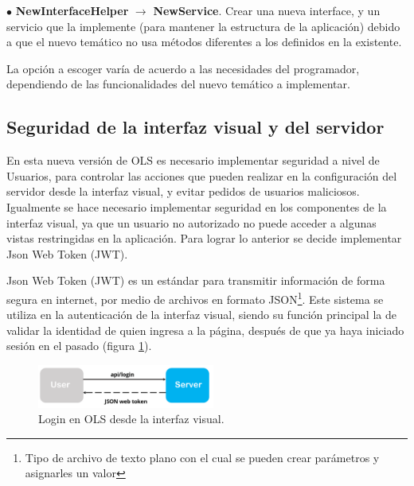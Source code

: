 $\bullet$ \textbf{NewInterfaceHelper} $\rightarrow$ \textbf{NewService}. Crear una nueva interface, y un servicio que la implemente (para mantener la estructura de la aplicaci\'on) debido a que el nuevo tem\'atico no usa m\'etodos diferentes a los definidos en la existente.

La opci\'on a escoger var\'ia de acuerdo a las necesidades del programador, dependiendo de las funcionalidades del nuevo tem\'atico a implementar.



\subsection{Seguridad de la interfaz visual y del servidor}
En esta nueva versi\'on de OLS es necesario implementar seguridad a nivel de Usuarios, para controlar las acciones que pueden realizar en la configuraci\'on del servidor desde la interfaz visual, y evitar pedidos de usuarios maliciosos. Igualmente se hace necesario implementar seguridad en los componentes de la interfaz visual, ya que un usuario no autorizado no puede acceder a algunas vistas restringidas en la aplicaci\'on. Para lograr lo anterior se decide implementar Json Web Token (JWT).

Json Web Token (JWT) es un est\'andar para transmitir informaci\'on de forma segura en internet, por medio de archivos en formato JSON\footnote{Tipo de archivo de texto plano con el cual se pueden crear par\'ametros y asignarles un valor}. Este sistema se utiliza en la autenticaci\'on de la interfaz visual, siendo su funci\'on principal la de validar la identidad de quien ingresa a la p\'agina, despu\'es de que ya haya iniciado sesi\'on en el pasado (figura \ref{login}). 

\begin{figure}
\vspace{-20pt}
\begin{center}
\includegraphics[width=0.52\textwidth]{images/login.png} 
\end{center} \vspace{-20pt} \caption{Login en OLS desde la interfaz visual.}  \label{login} \vspace{-10pt} 
\end{figure}

